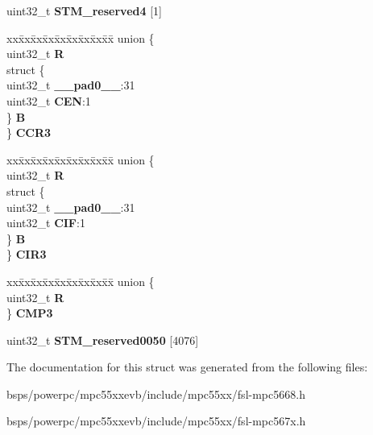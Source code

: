 \begin{DoxyCompactItemize}
\begin{tabbing}
\end{tabbing}\item 
\mbox{\label{structSTM__tag_a851626bcd07554e548246b6c2acd7344}} 
uint32\+\_\+t {\bfseries S\+T\+M\+\_\+reserved4} \mbox{[}1\mbox{]}
\item 
\mbox{\label{structSTM__tag_a499a4b68e4eb3224d48e4f7969d39cae}} 
\begin{tabbing}
xx\=xx\=xx\=xx\=xx\=xx\=xx\=xx\=xx\=\kill
union \{\\
\>uint32\_t {\bfseries R}\\
\>struct \{\\
\>\>uint32\_t {\bfseries \_\_pad0\_\_}:31\\
\>\>uint32\_t {\bfseries CEN}:1\\
\>\} {\bfseries B}\\
\} {\bfseries CCR3}\\

\end{tabbing}\item 
\mbox{\label{structSTM__tag_aecf56a9bbc04a22bf6e4b08f6e68eec6}} 
\begin{tabbing}
xx\=xx\=xx\=xx\=xx\=xx\=xx\=xx\=xx\=\kill
union \{\\
\>uint32\_t {\bfseries R}\\
\>struct \{\\
\>\>uint32\_t {\bfseries \_\_pad0\_\_}:31\\
\>\>uint32\_t {\bfseries CIF}:1\\
\>\} {\bfseries B}\\
\} {\bfseries CIR3}\\

\end{tabbing}\item 
\mbox{\label{structSTM__tag_a947d0ac83bc01a359bd95ea04af8e145}} 
\begin{tabbing}
xx\=xx\=xx\=xx\=xx\=xx\=xx\=xx\=xx\=\kill
union \{\\
\>uint32\_t {\bfseries R}\\
\} {\bfseries CMP3}\\

\end{tabbing}\item 
\mbox{\label{structSTM__tag_aaad1abdc0119c9fb69f614db0b7be926}} 
uint32\+\_\+t {\bfseries S\+T\+M\+\_\+reserved0050} \mbox{[}4076\mbox{]}
\end{DoxyCompactItemize}


The documentation for this struct was generated from the following files\+:\begin{DoxyCompactItemize}
\item 
bsps/powerpc/mpc55xxevb/include/mpc55xx/fsl-\/mpc5668.\+h\item 
bsps/powerpc/mpc55xxevb/include/mpc55xx/fsl-\/mpc567x.\+h\end{DoxyCompactItemize}
